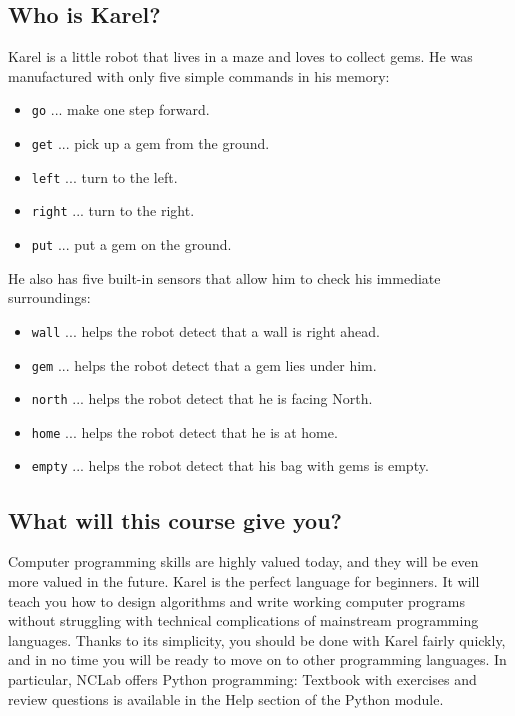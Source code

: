 
\subsection{Who is Karel?}

Karel is a little robot that lives in a maze and loves to collect gems.
He was manufactured with only five simple commands in his memory:

\begin{itemize}
\item {\color{blue} \tt go} ... make one step forward.
\item {\color{blue} \tt get} ... pick up a gem from the ground. 
\item {\color{blue} \tt left} ... turn to the left.
\item {\color{blue} \tt right} ... turn to the right. 
\item {\color{blue} \tt put} ... put a gem on the ground. 
\end{itemize}
He also has five built-in sensors that allow him to check his immediate surroundings:
\begin{itemize}
\item {\color{ForestGreen} \tt wall} ... helps the robot detect that a wall is right ahead.
\item {\color{ForestGreen} \tt gem} ... helps the robot detect that a gem lies under him.
\item {\color{ForestGreen} \tt north} ... helps the robot detect that he is facing North.
\item {\color{ForestGreen} \tt home} ... helps the robot detect that he is at home.
\item {\color{ForestGreen} \tt empty} ... helps the robot detect that his bag with gems is empty.
\end{itemize}

\subsection{What will this course give you?}

Computer programming skills are highly valued today, and they will be even more 
valued in the future. Karel is the perfect language for beginners. It will teach
you how to design algorithms and write working computer programs without struggling 
with technical complications of mainstream programming languages. Thanks to its 
simplicity, you should be done with Karel fairly quickly, and in no time you will be 
ready to move on to other programming languages. In particular, NCLab offers
Python programming: Textbook with exercises and review questions is available in
the Help section of the Python module.  

